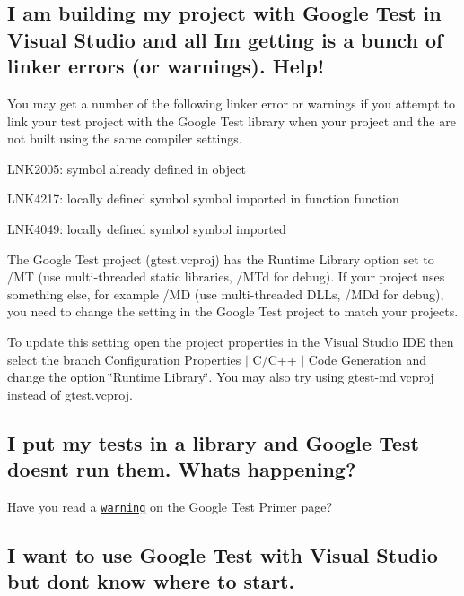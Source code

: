 \subsection*{I am building my project with Google Test in Visual Studio and all I\textquotesingle{}m getting is a bunch of linker errors (or warnings). Help!}

You may get a number of the following linker error or warnings if you attempt to link your test project with the Google Test library when your project and the are not built using the same compiler settings.


\begin{DoxyItemize}
\item L\+N\+K2005\+: symbol already defined in object
\item L\+N\+K4217\+: locally defined symbol \textquotesingle{}symbol\textquotesingle{} imported in function \textquotesingle{}function\textquotesingle{}
\item L\+N\+K4049\+: locally defined symbol \textquotesingle{}symbol\textquotesingle{} imported
\end{DoxyItemize}

The Google Test project (gtest.\+vcproj) has the Runtime Library option set to /\+MT (use multi-\/threaded static libraries, /\+M\+Td for debug). If your project uses something else, for example /\+MD (use multi-\/threaded D\+L\+Ls, /\+M\+Dd for debug), you need to change the setting in the Google Test project to match your project\textquotesingle{}s.

To update this setting open the project properties in the Visual Studio I\+DE then select the branch Configuration Properties $\vert$ C/\+C++ $\vert$ Code Generation and change the option \char`\"{}\+Runtime Library\char`\"{}. You may also try using gtest-\/md.\+vcproj instead of gtest.\+vcproj.

\subsection*{I put my tests in a library and Google Test doesn\textquotesingle{}t run them. What\textquotesingle{}s happening?}

Have you read a \href{Primer.md#important-note-for-visual-c-users}{\tt warning} on the Google Test Primer page?

\subsection*{I want to use Google Test with Visual Studio but don\textquotesingle{}t know where to start.}

